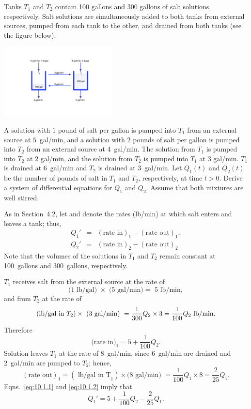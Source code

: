 \documentclass{ximera}
\begin{document}
\begin{example}\label{example:10.1.1}  
Tanks $T_1$ and $T_2$ contain 100 gallons and 300 gallons of salt
solutions, respectively. Salt solutions are simultaneously added to
both tanks from external sources, pumped from each tank to the other,
and drained from both tanks (see the figure below). 

\begin{image}
 \includegraphics[height=1.5in]{fig100101.jpg} 
\end{image}

A solution with
$1$ pound of salt per gallon is pumped into $T_1$ from an external source
at $5$~gal/min, and a solution with $2$ pounds of salt per gallon is
pumped into $T_2$ from an external source at $4$~gal/min. The solution
from $T_1$ is pumped into $T_2$ at 2 gal/min, and the solution from
$T_2$ is pumped into $T_1$ at $3$ gal/min. $T_1$ is drained at $6$~gal/min
and $T_2$ is drained at 3~gal/min. Let $Q_1(t)$ and $Q_2(t)$ be the
number of pounds of salt in $T_1$ and $T_2$, respectively, at time
$t>0$. Derive a system of differential equations for $Q_1$ and $Q_2$.
Assume that both mixtures are well stirred.

\begin{explanation}
As in Section~4.2, let  and  denote the rates (lb/min) at which salt enters and leaves a tank;
thus,
\begin{eqnarray*}
Q_1'&=&(\mbox{rate in})_1-(\mbox{rate out})_1,\\
Q_2'&=&(\mbox{rate in})_2-(\mbox{rate out})_2
\end{eqnarray*}
Note that the volumes of the solutions in $T_1$ and $T_2$
remain constant at 100~gallons and 300~gallons, respectively.

$T_1$ receives salt from the external source at the rate of
$$
\mbox{(1 lb/gal) }\times\mbox{ (5~gal/min)}=\mbox{ 5 lb/min},
$$
and from $T_2$ at the rate of
$$
\mbox{(lb/gal in }T_2)\times\mbox{ (3~gal/min)
}=\frac{1}{300}Q_2\times3\\=\frac{1}{100}Q_2 \mbox{ lb/min}.
$$
Therefore
\begin{equation} \label{eq:10.1.1}
\mbox{(rate in)}_1= 5+\frac{1}{100}Q_2.
\end{equation}
Solution leaves $T_1$  at the rate of 8~gal/min, since 6~gal/min are
drained and 2~gal/min are pumped to $T_2$; hence,
\begin{equation} \label{eq:10.1.2}
(\mbox{rate out})_1=(\mbox{ lb/gal in T}_1)\times \mbox{(8~gal/min) }
=\frac{1}{100}Q_1\times8=\frac{2}{25}Q_1.
\end{equation}
Eqns.~\eqref{eq:10.1.1} and \eqref{eq:10.1.2}  imply that
\begin{equation} \label{eq:10.1.3}
Q_1'=5+\frac{1}{100}Q_2-\frac{2}{25}Q_1.
\end{equation}


\end{explanation}
\end{example}
\end{document}
